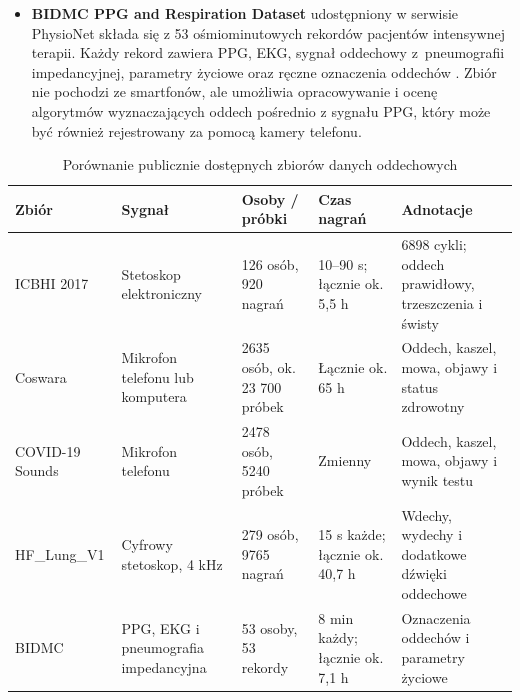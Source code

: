 \begin{itemize}
    \item \textbf{BIDMC PPG and Respiration Dataset} udostępniony w serwisie PhysioNet składa się z 53 ośmiominutowych rekordów pacjentów intensywnej terapii. Każdy rekord zawiera PPG, EKG, sygnał oddechowy z~pneumografii impedancyjnej, parametry życiowe oraz ręczne oznaczenia oddechów \cite{bidmcRespirationDataset}. Zbiór nie pochodzi ze smartfonów, ale umożliwia opracowywanie i ocenę algorytmów wyznaczających oddech pośrednio z sygnału PPG, który może być również rejestrowany za pomocą kamery telefonu.
\end{itemize}

\begin{table}[htbp]
    \centering
    \caption{Porównanie publicznie dostępnych zbiorów danych oddechowych}
    \label{tab:respiratory_datasets}
    \footnotesize
    \setlength{\tabcolsep}{4pt}
    \renewcommand{\arraystretch}{1.1}
    \begin{tabularx}{\textwidth}{@{}p{2cm}p{2.4cm}p{2.5cm}p{2.1cm}X@{}}
        \toprule
        \textbf{Zbiór} & \textbf{Sygnał} & \textbf{Osoby / próbki} & \textbf{Czas nagrań} & \textbf{Adnotacje} \\
        \midrule
        ICBHI 2017 \cite{rocha2019respiratoryDatabase}
        & Stetoskop elektroniczny
        & 126 osób, 920 nagrań
        & 10--90 s; łącznie ok. 5,5 h
        & 6898 cykli; oddech prawidłowy, trzeszczenia i świsty \\
        \midrule

        Coswara \cite{bhattacharya2023coswara}
        & Mikrofon telefonu lub komputera
        & 2635 osób, ok. 23 700 próbek
        & Łącznie ok. 65 h
        & Oddech, kaszel, mowa, objawy i status zdrowotny \\
        \midrule

        COVID-19 Sounds \cite{han2022covidSounds}
        & Mikrofon telefonu
        & 2478 osób, 5240 próbek
        & Zmienny
        & Oddech, kaszel, mowa, objawy i wynik testu \\
        \midrule

        HF\_Lung\_V1 \cite{hsu2021hfLung}
        & Cyfrowy stetoskop, 4 kHz
        & 279 osób, 9765 nagrań
        & 15 s każde; łącznie ok. 40,7 h
        & Wdechy, wydechy i dodatkowe dźwięki oddechowe \\
        \midrule

        BIDMC \cite{bidmcRespirationDataset}
        & PPG, EKG i pneumografia impedancyjna
        & 53 osoby, 53 rekordy
        & 8 min każdy; łącznie ok. 7,1 h
        & Oznaczenia oddechów i parametry życiowe \\
        \bottomrule
    \end{tabularx}
\end{table}

